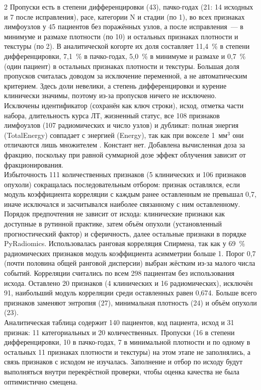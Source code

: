 \documentclass[11pt, a4paper]{article}
\begin{document}
\begin{multicols}{2}
Пропуски есть в степени дифференцировки (43), пачко-годах (21: 14 исходных и 7 после исправления), расе, категории N и стадии (по 1), во всех признаках лимфоузлов у 45 пациентов без поражённых узлов, а после исправления~--- в минимуме и размахе плотности (по 10) и остальных признаках плотности и текстуры (по 2). В аналитической когорте их доля составляет 11,4~\% в степени дифференцировки, 7,1~\% в пачко-годах, 5,0~\% в минимуме и размахе и 0,7~\% (один пациент) в остальных признаках плотности и текстуры. Большая доля пропусков считалась доводом за исключение переменной, а не автоматическим критерием. Здесь доли невелики, а степень дифференцировки и курение клинически значимы, поэтому из-за пропусков ничего не исключено.\vspace{6pt}\\
Исключены идентификатор (сохранён как ключ строки), исход, отметка части набора, длительность курса ЛТ, жизненный статус, все 108 признаков лимфоузлов (107 радиомических и число узлов) и дубликат: полная энергия (TotalEnergy) совпадает с энергией (Energy), так как при вокселе 1~мм$^3$ они отличаются лишь множителем \cite{PyRadiomicsDocs}. Констант нет. Добавлена вычисленная доза за фракцию, поскольку при равной суммарной дозе эффект облучения зависит от фракционирования.\vspace{6pt}\\
Избыточность 111 количественных признаков (5 клинических и 106 признаков опухоли) сокращалась последовательным отбором: признак оставлялся, если модуль коэффициента корреляции с каждым ранее оставленным не превышал 0,7, иначе исключался и засчитывался наиболее связанному с ним оставленному. Порядок предпочтения не зависит от исхода: клинические признаки как доступные в рутинной практике, затем объём опухоли (установленный прогностический фактор) и сферичность, далее остальные признаки в порядке PyRadiomics. Использовалась ранговая корреляция Спирмена, так как у 69~\% радиомических признаков модуль коэффициента асимметрии больше 1. Порог 0,7 (почти половина общей ранговой дисперсии) выбран жёстким из-за малого числа событий. Корреляции считались по всем 298 пациентам без использования исхода. Оставлено 20 признаков (4 клинических и 16 радиомических), исключён 91, наибольший модуль корреляции среди оставленных равен 0,674. Больше всего признаков заменяют энтропия (27), минимальная плотность (24) и объём опухоли (23).\vspace{6pt}\\
Аналитическая таблица содержит 140 пациентов, код пациента, исход и 31 признак: 11 категориальных и 20 количественных. Пропуски (16 в степени дифференцировки, 10 в пачко-годах, 7 в минимальной плотности и по одному в остальных 11 признаках плотности и текстуры) на этом этапе не заполнялись, а связь признаков с исходом не изучалась. Заполнение и отбор по исходу будут выполняться внутри перекрёстной проверки, чтобы оценка качества не была оптимистично смещена.

\end{multicols}
\end{document}
